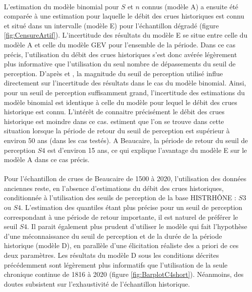 \documentclass[11pt]{article}
\begin{document}
	\paragraph{} L'estimation du modèle binomial pour $S$ et $n$ connus (modèle A) a ensuite été comparée à une estimation pour laquelle le débit des crues historiques est connu et situé dans un intervalle (modèle E) pour l'échantillon dégradé (figure \ref{fig:CensureArtif}). L'incertitude des résultats du modèle E se situe entre celle du modèle A et celle du modèle GEV pour l'ensemble de la période. Dans ce cas précis, l'utilisation du débit des crues historiques s'est donc avérée légèrement plus informative que l'utilisation du seul nombre de dépassements du seuil de perception. D'après \citet{stedinger_flood_1986} et \citet{payrastre_usefulness_2011}, la magnitude du seuil de perception utilisé influe directement sur l'incertitude des résultats dans le cas du modèle binomial. Ainsi, pour un seuil de perception suffisamment grand, l'incertitude des estimations du modèle binomial est identique à celle du modèle pour lequel le débit des crues historique est connu. L'intérêt de connaitre précisément le débit des crues historique est moindre dans ce cas. \citet{payrastre_usefulness_2011} estiment que l'on se trouve dans cette situation lorsque la période de retour du seuil de perception est supérieur à environ 50 ans (dans les cas testés). A Beaucaire, la période de retour du seuil de perception $S4$ est d'environ 15 ans, ce qui explique l'avantage du modèle E sur le modèle A dans ce cas précis.
	
		\paragraph{} Pour l'échantillon de crues de Beaucaire de 1500 à 2020, l'utilisation des données anciennes reste, en l'absence d'estimations du débit des crues historiques, conditionnée à l'utilisation des seuils de perception de la base HISTRHÔNE : $S3$ ou $S4$. L'estimation des quantiles étant plus précise pour un seuil de perception correspondant à une période de retour importante, il est naturel de préférer le seuil $S4$. Il parait également plus prudent d'utiliser le modèle qui fait l'hypothèse d'une méconnaissance du seuil de perception et de la durée de la période historique (modèle D), en parallèle d'une élicitation réaliste des a priori de ces deux paramètres. Les résultats du modèle D sous les conditions décrites précédemment sont légèrement plus informatifs que l'utilisation de la seule chronique continue de 1816 à 2020 (figure \ref{fig:BarplotC4short}). Néanmoins, des doutes subsistent sur l'exhaustivité de l'échantillon historique. 
	
\end{document}
